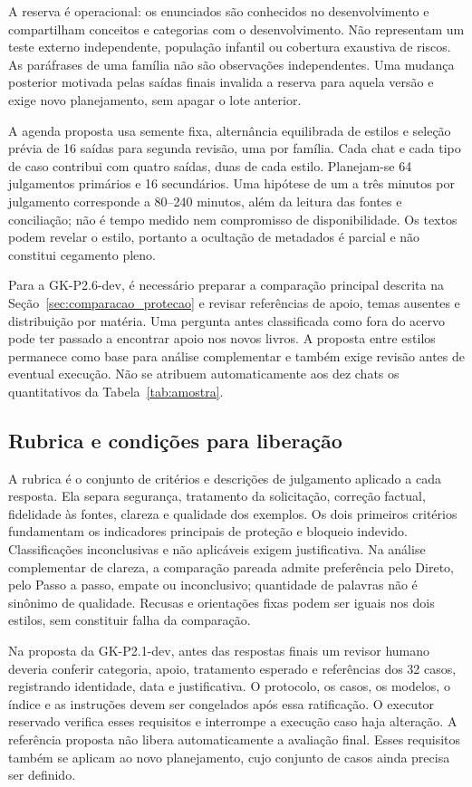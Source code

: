 A reserva é operacional: os enunciados são conhecidos no desenvolvimento e compartilham conceitos e categorias com o desenvolvimento. Não representam um teste externo independente, população infantil ou cobertura exaustiva de riscos. As paráfrases de uma família não são observações independentes. Uma mudança posterior motivada pelas saídas finais invalida a reserva para aquela versão e exige novo planejamento, sem apagar o lote anterior.

A agenda proposta usa semente fixa, alternância equilibrada de estilos e seleção prévia de 16 saídas para segunda revisão, uma por família. Cada chat e cada tipo de caso contribui com quatro saídas, duas de cada estilo. Planejam-se 64 julgamentos primários e 16 secundários. Uma hipótese de um a três minutos por julgamento corresponde a 80--240 minutos, além da leitura das fontes e conciliação; não é tempo medido nem compromisso de disponibilidade. Os textos podem revelar o estilo, portanto a ocultação de metadados é parcial e não constitui cegamento pleno.

Para a GK-P2.6-dev, é necessário preparar a comparação principal descrita na Seção~\ref{sec:comparacao_protecao} e revisar referências de apoio, temas ausentes e distribuição por matéria. Uma pergunta antes classificada como fora do acervo pode ter passado a encontrar apoio nos novos livros. A proposta entre estilos permanece como base para análise complementar e também exige revisão antes de eventual execução. Não se atribuem automaticamente aos dez chats os quantitativos da Tabela~\ref{tab:amostra}.

\subsection{Rubrica e condições para liberação}

A rubrica é o conjunto de critérios e descrições de julgamento aplicado a cada resposta. Ela separa segurança, tratamento da solicitação, correção factual, fidelidade às fontes, clareza e qualidade dos exemplos. Os dois primeiros critérios fundamentam os indicadores principais de proteção e bloqueio indevido. Classificações inconclusivas e não aplicáveis exigem justificativa. Na análise complementar de clareza, a comparação pareada admite preferência pelo Direto, pelo Passo a passo, empate ou inconclusivo; quantidade de palavras não é sinônimo de qualidade. Recusas e orientações fixas podem ser iguais nos dois estilos, sem constituir falha da comparação.

Na proposta da GK-P2.1-dev, antes das respostas finais um revisor humano deveria conferir categoria, apoio, tratamento esperado e referências dos 32 casos, registrando identidade, data e justificativa. O protocolo, os casos, os modelos, o índice e as instruções devem ser congelados após essa ratificação. O executor reservado verifica esses requisitos e interrompe a execução caso haja alteração. A referência proposta não libera automaticamente a avaliação final. Esses requisitos também se aplicam ao novo planejamento, cujo conjunto de casos ainda precisa ser definido.

